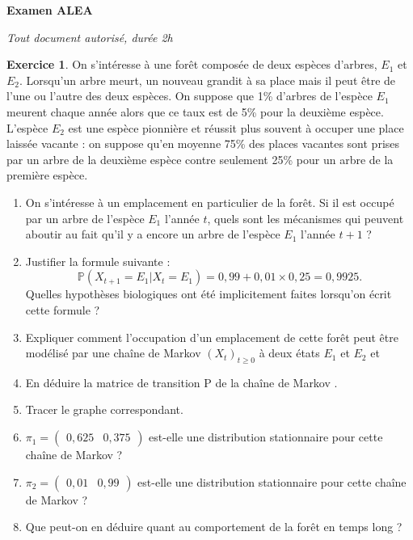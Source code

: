 \documentclass[10pt,fleqn, svgnames]{article}
\theoremstyle{definition}
\newtheorem{exo}{Exercice}
\begin{document}
\begin{center}
  {\large
    {\bf Examen ALEA }

   }

  \bigskip
  {\em Tout document autorisé, durée 2h }


\end{center}



\begin{exo}
On s’int\'eresse \`a une forêt compos\'ee de deux esp\`eces d’arbres, $E_1$ et $E_2$. 
Lorsqu’un arbre meurt, un nouveau grandit \`a
sa place mais il peut être de l’une ou l’autre des deux esp\`eces. 
On suppose que 1\% d'arbres de l'espèce $E_1$ meurent  chaque ann\'ee alors
que ce taux est de 5\% pour la deuxi\`eme esp\`ece. 
L'espèce $E_2$ est une espèce pionnière et r\'eussit plus souvent \`a occuper une place laiss\'ee vacante : on suppose qu'en moyenne 75\%
des places vacantes sont prises par un arbre de la deuxi\`eme esp\`ece contre seulement 25\% pour un arbre de la premi\`ere esp\`ece.
\begin{enumerate}
\item On s'intéresse à un emplacement en particulier de la forêt. Si il est occupé par un arbre de l'espèce $E_1$ l'année $t$, quels sont  les mécanismes qui peuvent aboutir au fait qu'il y a encore un arbre de l'espèce $E_1$ l'année $t+1$ ?
\item Justifier la formule suivante :
$$\mathbb P(X_{t+1} = E_1|X_t = E_1)=0, 99 + 0, 01 \times 0, 25 = 0, 9925.$$ Quelles hypothèses biologiques ont été implicitement faites lorsqu'on écrit cette formule ?
\item Expliquer comment l'occupation d'un emplacement de cette forêt peut être modélisé par une chaîne
de Markov $(X_t)_{t\geq 0}$ \`a deux \'etats $E_1$ et $E_2$ et 
\item En d\'eduire la matrice de transition P de la chaîne de Markov .
\item Tracer le graphe correspondant.
\item $\pi_1 = \begin{pmatrix}0, 625 &0, 375\end{pmatrix}$ est-elle une distribution stationnaire pour cette chaîne de Markov ?
\item $\pi_2 = \begin{pmatrix}0, 01 &0, 99\end{pmatrix}$ est-elle une distribution stationnaire pour cette chaîne de Markov ?
\item Que peut-on en déduire quant au comportement de la forêt en temps long ?
\end{enumerate}
\end{exo}
\end{document}
